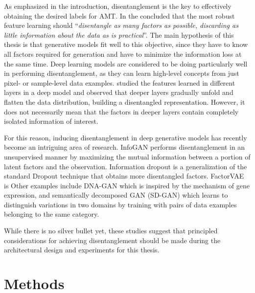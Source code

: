 As emphasized in the introduction, disentanglement is the key to effectively obtaining the desired labels for AMT.
In the  concluded that the most robust feature learning should ``\emph{disentangle as many factors as possible, discarding as little information about the data as is practical}''.
The main hypothesis of this thesis is that generative models fit well to this objective, since they have to know all factors required for generation and have to minimize the information loss at the same time.
Deep learning models are considered to be doing particularly well in performing disentanglement, as they can learn high-level concepts from just pixel- or sample-level data examples.
 studied the features learned in different layers in a deep model and observed that deeper layers gradually unfold and flatten the data distribution, building a disentangled representation.
However, it does not necessarily mean that the factors in deeper layers contain completely isolated information of interest.

For this reason, inducing disentanglement in deep generative models has recently become an intriguing area of research.
InfoGAN \cite{chen2016infogan} performs disentanglement in an unsupervised manner by maximizing the mutual information between a portion of latent factors and the observation.
Information dropout \cite{achille2018information} is a generalization of the standard Dropout technique that obtains more disentangled factors.
FactorVAE \cite{kim2018factor} is 
Other examples include DNA-GAN \cite{xiao2017dnagan} which is inspired by the mechanism of gene expression,
and semantically decomposed GAN (SD-GAN) \cite{donahue2017gan} which learns to distinguish variations in two domains by training with pairs of data examples belonging to the same category.

While there is no silver bullet yet, these studies suggest that principled considerations for achieving disentanglement should be made during the architectural design and experiments for this thesis.


\section{Methods}

